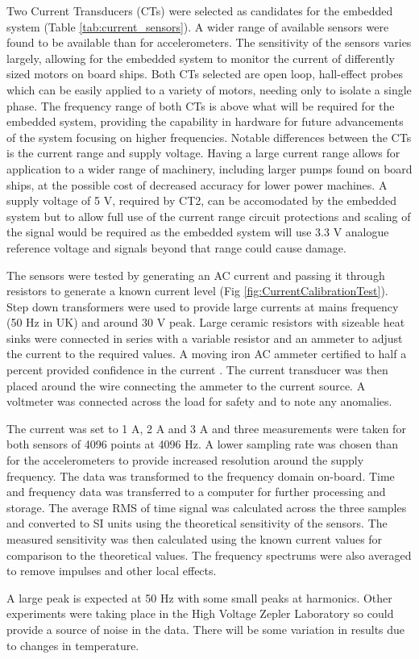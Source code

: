 Two Current Transducers (CTs) were selected as candidates for the embedded system (Table \ref{tab:current_sensors}).
A wider range of available sensors were found to be available than for accelerometers.
The sensitivity of the sensors varies largely, allowing for the embedded system to monitor the current of differently sized motors on board ships.
Both CTs selected are open loop, hall-effect probes which can be easily applied to a variety of motors, needing only to isolate a single phase.
The frequency range of both CTs is above what will be required for the embedded system, providing the capability in hardware for future advancements of the system focusing on higher frequencies.
Notable differences between the CTs is the current range and supply voltage.
Having a large current range allows for application to a wider range of machinery, including larger pumps found on board ships, at the possible cost of decreased accuracy for lower power machines.
A supply voltage of 5 V, required by CT2, can be accomodated by the embedded system but to allow full use of the current range circuit protections and scaling of the signal would be required as the embedded system will use 3.3 V analogue reference voltage and signals beyond that range could cause damage.
\par
The sensors were tested by generating an AC current and passing it through resistors to generate a known current level (Fig \ref{fig:CurrentCalibrationTest}).
Step down transformers were used to provide large currents at mains frequency (50 Hz in UK) and around 30 V peak.
Large ceramic resistors with sizeable heat sinks were connected in series with a variable resistor and an ammeter to adjust the current to the required values.
A moving iron AC ammeter certified to half a percent provided confidence in the current \cite{Ammeter_certificate}.
The current transducer was then placed around the wire connecting the ammeter to the current source.
A voltmeter was connected across the load for safety and to note any anomalies.
\par
The current was set to 1 A, 2 A and 3 A and three measurements were taken for both sensors of 4096 points at 4096 Hz.
A lower sampling rate was chosen than for the accelerometers to provide increased resolution around the supply frequency.
The data was transformed to the frequency domain on-board.
Time and frequency data was transferred to a computer for further processing and storage.
The average RMS of time signal was calculated across the three samples and converted to SI units using the theoretical sensitivity of the sensors.
The measured sensitivity was then calculated using the known current values for comparison to the theoretical values.
The frequency spectrums were also averaged to remove impulses and other local effects.
\par
A large peak is expected at 50 Hz with some small peaks at harmonics.
Other experiments were taking place in the High Voltage Zepler Laboratory so could provide a source of noise in the data.
There will be some variation in results due to changes in temperature.




